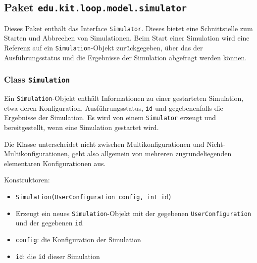 \documentclass[parskip=full,11pt]{scrartcl}
\begin{document}
\subsection{Paket \texttt{edu.kit.loop.model.simulator}}
Dieses Paket enthält das Interface \texttt{Simulator}. Dieses bietet eine Schnittstelle zum Starten und Abbrechen von Simulationen. Beim Start einer Simulation wird eine Referenz auf ein \texttt{Simulation}-Objekt zurückgegeben, über das der Ausführungsstatus und die Ergebnisse der Simulation abgefragt werden können.

\subsubsection{Class \texttt{Simulation}}
Ein \texttt{Simulation}-Objekt enthält Informationen zu einer gestarteten Simulation, etwa deren Konfiguration, Ausführungsstatus, \texttt{id} und gegebenenfalls die Ergebnisse der Simulation. Es wird von einem \texttt{Simulator} erzeugt und bereitgestellt, wenn eine Simulation gestartet wird.

Die Klasse unterscheidet nicht zwischen Multikonfigurationen und Nicht-Multikonfigurationen, geht also allgemein von mehreren zugrundeliegenden elementaren Konfigurationen aus.

Konstruktoren:
\begin{itemize} \itemsep -10pt
\item \texttt{Simulation(UserConfiguration config, int id)}
\item[] Erzeugt ein neues \texttt{Simulation}-Objekt mit der gegebenen \texttt{UserConfiguration} und der gegebenen \texttt{id}.
\item[] \texttt{config}: die Konfiguration der Simulation
\item[] \texttt{id}: die \texttt{id} dieser Simulation
\end{itemize}
\end{document}
